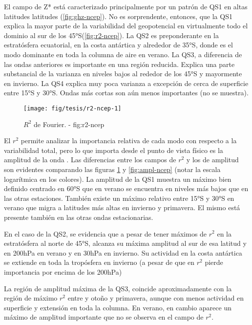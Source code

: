 \documentclass[spanish,a4paper]{book}
\begin{document}
El campo de Z* está caracterizado principalmente por un patrón de QS1 en
altas latitudes latitudes (\autoref{fig:ghz-ncep}). No es sorprendente,
entonces, que la QS1 explica la mayor parte de la variabilidad del
geopotencial en virtualmente todo el dominio al sur de los
45°S(\autoref{fig:r2-ncep}). La QS2 es preponderante en la estratósfera
ecuatorial, en la costa antártica y alrededor de 35°S, donde es el modo
dominante en toda la columna de aire en verano. La QS3, a diferencia de
las ondas anteriores es importante en una región reducida. Explica una
parte substancial de la varianza en niveles bajos al rededor de los 45°S
y mayormente en invierno. La QS4 explica muy poca varianza a excepción
de cerca de superficie entre 15°S y 30°S. Ondas más cortas son aún menos
importantes (no se muestra).

\begin{figure}

{\centering \texttt{[image: fig/tesis/r2-ncep-1]} 

}

\caption{$R^2$ de Fourier. - fig:r2-ncep}\label{fig:r2-ncep}
\end{figure}

El \(r^2\) permite analizar la importancia relativa de cada modo con
respecto a la variabilidad total, pero lo que importa desde el punto de
vista físico es la amplitud de la onda
. Las diferencias entre
los campos de \(r^2\) y los de amplitud son evidentes comparando las
figuras \ref{fig:r2-ncep} y \ref{fig:ampl-ncep} (notar la escala
logarítmica en los colores). La amplitud de la QS1 muestra un máximo
bien definido centrado en 60°S que en verano se encuentra en niveles más
bajos que en las otras estaciones. También existe un máximo relativo
entre 15°S y 30°S en verano que migra a latitudes más altas en invierno
y primavera. El mismo está presente también en las otras ondas
estacionarias.

En el caso de la QS2, se evidencia que a pesar de tener máximos de
\(r^2\) en la estratósfera al norte de 45°S, alcanza su máxima amplitud
al sur de esa latitud y en 200hPa en verano y en 30hPa en invierno. Su
actividad en la costa antártica se extiende en toda la tropósfera en
invierno (a pesar de que en \(r^2\) pierde importancia por encima de los
200hPa)

La región de amplitud máxima de la QS3, coincide aproximadamente con la
región de máximo \(r^2\) entre y otoño y primavera, aunque con menos
actividad en superficie y extensión en toda la columna. En verano, en
cambio aparece un máximo de amplitud importante que no se observa en el
campo de \(r^2\).
\end{document}
